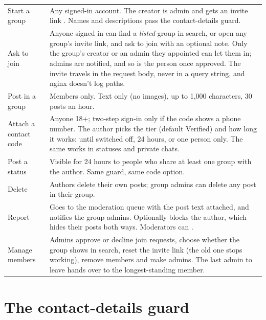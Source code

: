 \begin{tabularx}{\linewidth}{@{}L{4.2cm}Y@{}}
\toprule
{} &  \\
\midrule
Start a group & Any signed-in account. The creator is admin and gets an invite link . Names and descriptions pass the contact-details guard. \\
Ask to join & Anyone signed in can find a \emph{listed} group in search, or open any group's invite link, and ask to join with an optional note. Only the group's creator or an admin they appointed can let them in; admins are notified, and so is the person once approved. The invite travels in the request body, never in a query string, and nginx doesn't log  paths. \\
Post in a group & Members only. Text only (no images), up to 1{,}000 characters, 30 posts an hour. \\
Attach a contact code & Anyone 18+; two-step sign-in only if the code shows a phone number. The author picks the tier (default Verified) and how long it works: until switched off, 24 hours, or one person only. The same works in statuses and private chats. \\
Post a status & Visible for 24 hours to people who share at least one group with the author. Same guard, same code option. \\
Delete & Authors delete their own posts; group admins can delete any post in their group. \\
Report & Goes to the moderation queue with the post text attached, and notifies the group admins. Optionally blocks the author, which hides their posts both ways. Moderators can . \\
Manage members & Admins approve or decline join requests, choose whether the group shows in search, reset the invite link (the old one stops working), remove members and make admins. The last admin to leave hands over to the longest-standing member. \\
\bottomrule
\end{tabularx}

\section{The contact-details guard}

